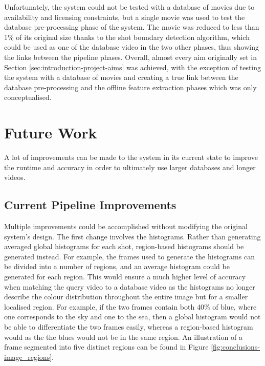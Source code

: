 Unfortunately, the system could not be tested with a database of movies due to availability and licensing constraints, but a single movie was used to test the database pre-processing phase of the system. The movie was reduced to less than 1\% of its original size thanks to the shot boundary detection algorithm, which could be used as one of the database video in the two other phases, thus showing the links between the pipeline phases. Overall, almost every aim originally set in Section \ref{sec:introduction-project-aims} was achieved, with the exception of testing the system with a database of movies and creating a true link between the database pre-processing and the offline feature extraction phases which was only conceptualised.
    

\section{Future Work}

A lot of improvements can be made to the system in its current state to improve the runtime and accuracy in order to ultimately use larger databases and longer videos.

\subsection{Current Pipeline Improvements}

Multiple improvements could be accomplished without modifying the original system's design. The first change involves the histograms. Rather than generating averaged global histograms for each shot, region-based histograms should be generated instead. For example, the frames used to generate the histograms can be divided into a number of regions, and an average histogram could be generated for each region. This would ensure a much higher level of accuracy when matching the query video to a database video as the histograms no longer describe the colour distribution throughout the entire image but for a smaller localised region. For example, if the two frames contain both 40\% of blue, where one corresponds to the sky and one to the sea, then a global histogram would not be able to differentiate the two frames easily, whereas a region-based histogram would as the the blues would not be in the same region. An illustration of a frame segmented into five distinct regions can be found in Figure \ref{fig:conclusions-image_regions}.

